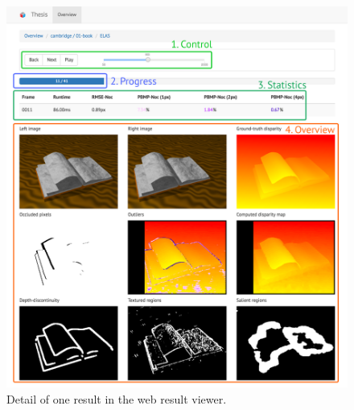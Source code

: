\begin{figure}[h!]
  \centering
  \includegraphics[width=1.0\textwidth]{src/images/result-viewer-detail.png}
  \caption[Detail of one result in the web result viewer]{Detail of one result in the web result viewer.}
  \label{fig:web-detail}
\end{figure}
